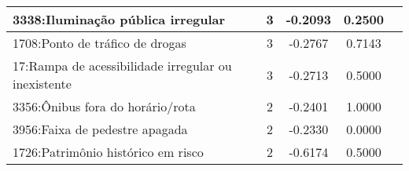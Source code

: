 \begin{table}[htbp]
\begin{tabular}{|l|c|c|c|c|}
		\hline
		3338:Iluminação pública irregular                     & 3                & -0.2093        & 0.2500           \\
		\hline
		1708:Ponto de tráfico de drogas                       & 3                & -0.2767        & 0.7143           \\
		\hline
		17:Rampa de acessibilidade irregular ou inexistente   & 3                & -0.2713        & 0.5000           \\
		\hline
		3356:Ônibus fora do horário/rota                      & 2                & -0.2401        & 1.0000           \\
		\hline
		3956:Faixa de pedestre apagada                        & 2                & -0.2330        & 0.0000           \\
		\hline
		1726:Patrimônio histórico em risco                    & 2                & -0.6174        & 0.5000           \\
		\hline
	\end{tabular}
\end{table}
